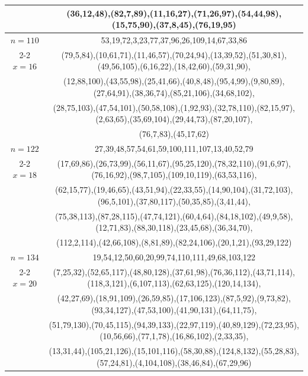 \begin{tabular}{| c | c |}
&(36,12,48),(82,7,89),(11,16,27),(71,26,97),(54,44,98),(15,75,90),(37,8,45),(76,19,95)\\
\hline 
\(n=110\) & 
53,19,72,3,23,77,37,96,26,109,14,67,33,86\\
\cline{2-2}
\(x=16\)
&(79,5,84),(10,61,71),(11,46,57),(70,24,94),(13,39,52),(51,30,81),(49,56,105),(6,16,22),(18,42,60),(59,31,90),\\
&(12,88,100),(43,55,98),(25,41,66),(40,8,48),(95,4,99),(9,80,89),(27,64,91),(38,36,74),(85,21,106),(34,68,102),\\
&(28,75,103),(47,54,101),(50,58,108),(1,92,93),(32,78,110),(82,15,97),(2,63,65),(35,69,104),(29,44,73),(87,20,107),\\
&(76,7,83),(45,17,62)\\
\hline 
\(n=122\) & 
27,39,48,57,54,61,59,100,111,107,13,40,52,79\\
\cline{2-2}
\(x=18\)
&(17,69,86),(26,73,99),(56,11,67),(95,25,120),(78,32,110),(91,6,97),(76,16,92),(98,7,105),(109,10,119),(63,53,116),\\
&(62,15,77),(19,46,65),(43,51,94),(22,33,55),(14,90,104),(31,72,103),(96,5,101),(37,80,117),(50,35,85),(3,41,44),\\
&(75,38,113),(87,28,115),(47,74,121),(60,4,64),(84,18,102),(49,9,58),(12,71,83),(88,30,118),(23,45,68),(36,34,70),\\
&(112,2,114),(42,66,108),(8,81,89),(82,24,106),(20,1,21),(93,29,122)\\
\hline 
\(n=134\) & 
19,54,12,50,60,20,99,74,110,111,49,68,103,122\\
\cline{2-2}
\(x=20\)
&(7,25,32),(52,65,117),(48,80,128),(37,61,98),(76,36,112),(43,71,114),(118,3,121),(6,107,113),(62,63,125),(120,14,134),\\
&(42,27,69),(18,91,109),(26,59,85),(17,106,123),(87,5,92),(9,73,82),(93,34,127),(47,53,100),(41,90,131),(64,11,75),\\
&(51,79,130),(70,45,115),(94,39,133),(22,97,119),(40,89,129),(72,23,95),(10,56,66),(77,1,78),(16,86,102),(2,33,35),\\
&(13,31,44),(105,21,126),(15,101,116),(58,30,88),(124,8,132),(55,28,83),(57,24,81),(4,104,108),(38,46,84),(67,29,96)\\
\hline 
\end{tabular}